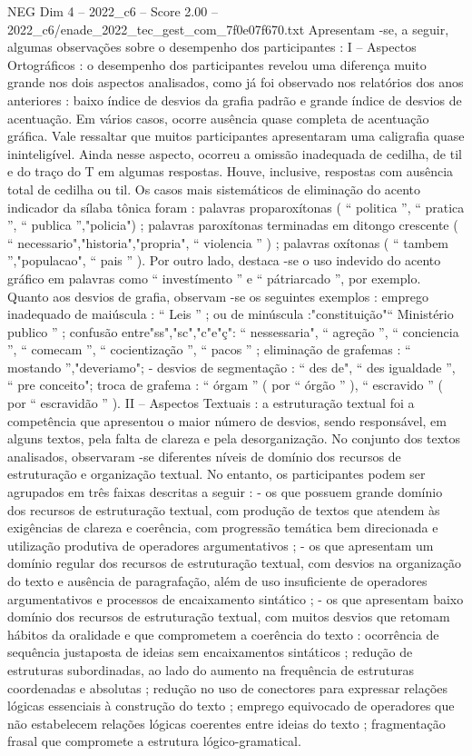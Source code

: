 \begin{textsample}{NEG Dim 4 – 2022\_c6 – Score 2.00 – 2022\_c6/enade\_2022\_tec\_gest\_com\_7f0e07f670.txt}
Apresentam -se, a seguir, algumas observações sobre o desempenho dos participantes : I – Aspectos Ortográficos : o desempenho dos participantes revelou uma diferença muito grande nos dois aspectos analisados, como já foi observado nos relatórios dos anos anteriores : baixo índice de desvios da grafia padrão e grande índice de desvios de acentuação.
Em vários casos, ocorre ausência quase completa de acentuação gráfica.
Vale ressaltar que muitos participantes apresentaram uma caligrafia quase ininteligível.
Ainda nesse aspecto, ocorreu a omissão inadequada de cedilha, de til e do traço do T em algumas respostas.
Houve, inclusive, respostas com ausência total de cedilha ou til.
Os casos mais sistemáticos de eliminação do acento indicador da sílaba tônica foram : palavras proparoxítonas ( “ politica ”, “ pratica ”, “ publica ”,"policia") ; palavras paroxítonas terminadas em ditongo crescente ( “ necessario","historia","propria", “ violencia ” ) ; palavras oxítonas ( “ tambem ”,"populacao", “ pais ” ).
Por outro lado, destaca -se o uso indevido do acento gráfico em palavras como “ investímento ” e “ pátriarcado ”, por exemplo.
Quanto aos desvios de grafia, observam -se os seguintes exemplos : emprego inadequado de maiúscula : “ Leis ” ; ou de minúscula :"constituição"“ Ministério publico ” ; confusão entre"ss","sc","c"e"ç": “ nessessaria", “ agreção ”, “ conciencia ”, “ comecam ”, “ cocientização ”, “ pacos ” ; eliminação de grafemas : “ mostando ”,"deveriamo"; - desvios de segmentação : “ des de", “ des igualdade ”, “ pre conceito"; troca de grafema : “ órgam ” ( por “ órgão ” ), “ escravido ” ( por “ escravidão ” ).
II – Aspectos Textuais : a estruturação textual foi a competência que apresentou o maior número de desvios, sendo responsável, em alguns textos, pela falta de clareza e pela desorganização.
No conjunto dos textos analisados, observaram -se diferentes níveis de domínio dos recursos de estruturação e organização textual.
No entanto, os participantes podem ser agrupados em três faixas descritas a seguir : - os que possuem grande domínio dos recursos de estruturação textual, com produção de textos que atendem às exigências de clareza e coerência, com progressão temática bem direcionada e utilização produtiva de operadores argumentativos ; - os que apresentam um domínio regular dos recursos de estruturação textual, com desvios na organização do texto e ausência de paragrafação, além de uso insuficiente de operadores argumentativos e processos de encaixamento sintático ; - os que apresentam baixo domínio dos recursos de estruturação textual, com muitos desvios que retomam hábitos da oralidade e que comprometem a coerência do texto : ocorrência de sequência justaposta de ideias sem encaixamentos sintáticos ; redução de estruturas subordinadas, ao lado do aumento na frequência de estruturas coordenadas e absolutas ; redução no uso de conectores para expressar relações lógicas essenciais à construção do texto ; emprego equivocado de operadores que não estabelecem relações lógicas coerentes entre ideias do texto ; fragmentação frasal que compromete a estrutura lógico-gramatical.

\end{textsample}
